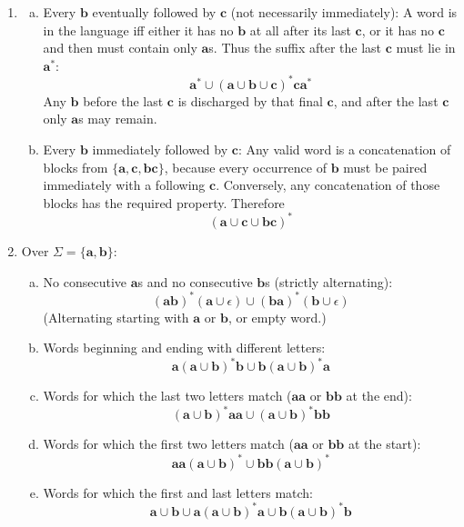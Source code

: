 \begin{enumerate}[{6.}1.]
\item \begin{enumerate}[(a)]
  \item Every $\pmb{b}$ eventually followed by $\pmb{c}$ (not necessarily immediately):
  A word is in the language iff either it has no $\pmb{b}$ at all after its
  last $\pmb{c}$, or it has no $\pmb{c}$ and then must contain only $\pmb{a}$s.
  Thus the suffix after the last $\pmb{c}$ must lie in $\pmb{a}^*$:
  \[
    \pmb{a}^* \cup (\pmb{a}\cup\pmb{b}\cup\pmb{c})^*\pmb{c}\pmb{a}^*
  \]
  Any $\pmb{b}$ before the last $\pmb{c}$ is discharged by that final
  $\pmb{c}$, and after the last $\pmb{c}$ only $\pmb{a}$s may remain.

  \item Every $\pmb{b}$ immediately followed by $\pmb{c}$:
  Any valid word is a concatenation of blocks from
  $\{\pmb{a},\pmb{c},\pmb{bc}\}$, because every occurrence of $\pmb{b}$ must be
  paired immediately with a following $\pmb{c}$. Conversely, any concatenation
  of those blocks has the required property. Therefore
  \[
    (\pmb{a}\cup\pmb{c}\cup\pmb{bc})^*
  \]
\end{enumerate}

\item Over $\Sigma=\{\pmb{a},\pmb{b}\}$:

\begin{enumerate}[(a)]
  \item No consecutive $\pmb{a}$s and no consecutive $\pmb{b}$s (strictly alternating):
  \[
    (\pmb{ab})^*(\pmb{a}\cup\epsilon) \cup (\pmb{ba})^*(\pmb{b}\cup\epsilon)
  \]
  (Alternating starting with $\pmb{a}$ or $\pmb{b}$, or empty word.)

  \item Words beginning and ending with different letters:
  \[
    \pmb{a}(\pmb{a}\cup\pmb{b})^*\pmb{b} \cup \pmb{b}(\pmb{a}\cup\pmb{b})^*\pmb{a}
  \]

  \item Words for which the last two letters match ($\pmb{aa}$ or $\pmb{bb}$ at the end):
  \[
    (\pmb{a}\cup\pmb{b})^*\pmb{aa} \cup (\pmb{a}\cup\pmb{b})^*\pmb{bb}
  \]

  \item Words for which the first two letters match ($\pmb{aa}$ or $\pmb{bb}$ at the start):
  \[
    \pmb{aa}(\pmb{a}\cup\pmb{b})^* \cup \pmb{bb}(\pmb{a}\cup\pmb{b})^*
  \]

	  \item Words for which the first and last letters match:
	  \[
	    \pmb{a} \cup \pmb{b} \cup \pmb{a}(\pmb{a}\cup\pmb{b})^*\pmb{a} \cup \pmb{b}(\pmb{a}\cup\pmb{b})^*\pmb{b}
	  \]
	\end{enumerate}


\end{enumerate}
